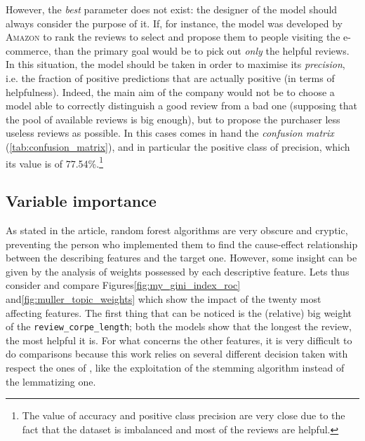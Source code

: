 \documentclass[a4paper]{article}
\begin{document}
			However, the \emph{best} parameter does not exist: the designer of the model should always consider the purpose of it. If, for instance, the model was developed by \textsc{Amazon} to rank the reviews to select and propose them to people visiting the e-commerce, than the primary goal would be to pick out \emph{only} the helpful reviews. In this situation, the model should be taken in order to maximise its \emph{precision}, i.e. the fraction of positive predictions that are actually positive (in terms of helpfulness). Indeed, the main aim of the company would not be to choose a model able to correctly distinguish a good review from a bad one (supposing that the pool of available reviews is big enough), but to propose the purchaser less useless reviews as possible. In this cases comes in hand the \emph{confusion matrix} (\autoref{tab:confusion_matrix}), and in particular the positive class of precision, which its value is of 77.54\%.\footnote{The value of accuracy and positive class precision are very close due to the fact that the dataset is imbalanced and most of the reviews are helpful.}
			
		\subsection{Variable importance}
			As stated in the article, random forest algorithms are very obscure and cryptic, preventing the person who implemented them to find the cause-effect relationship between the describing features and the target one. However, some insight can be given by the analysis of weights possessed by each descriptive feature. Lets thus consider and compare Figures\autoref{fig:my_gini_index_roc} and\autoref{fig:muller_topic_weights} which show the impact of the twenty most affecting features. The first thing that can be noticed is the (relative) big weight of the \verb*|review_corpe_length|; both the models show that the longest the review, the most helpful it is. For what concerns the other features, it is very difficult to do comparisons because this work relies on several different decision taken with respect the ones of \cite{article:muller}, like the exploitation of the stemming algorithm instead of the lemmatizing one.
			
\end{document}
